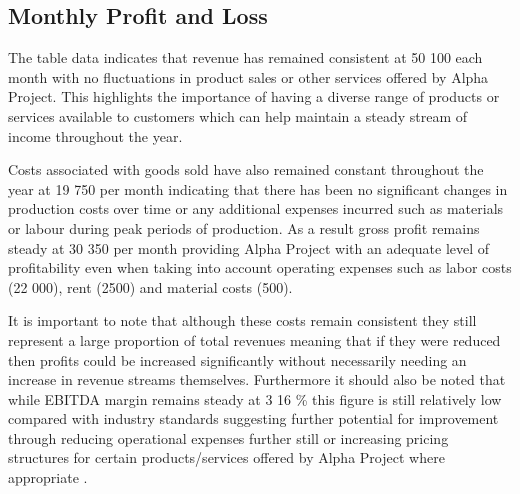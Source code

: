 

\subsection{Monthly Profit and Loss}\label{sec:title}

The table data indicates that revenue has remained consistent at 50 100 each month with no fluctuations in product sales or other services offered by Alpha Project. This highlights the importance of having a diverse range of products or services available to customers which can help maintain a steady stream of income throughout the year. 

Costs associated with goods sold have also remained constant throughout the year at 19 750 per month indicating that there has been no significant changes in production costs over time or any additional expenses incurred such as materials or labour during peak periods of production. As a result gross profit remains steady at 30 350 per month providing Alpha Project with an adequate level of profitability even when taking into account operating expenses such as labor costs (22 000), rent (2500) and material costs (500). 

It is important to note that although these costs remain consistent they still represent a large proportion of total revenues meaning that if they were reduced then profits could be increased significantly without necessarily needing an increase in revenue streams themselves. Furthermore it should also be noted that while EBITDA margin remains steady at 3 16 \% this figure is still relatively low compared with industry standards suggesting further potential for improvement through reducing operational expenses further still or increasing pricing structures for certain products/services offered by Alpha Project where appropriate . 

